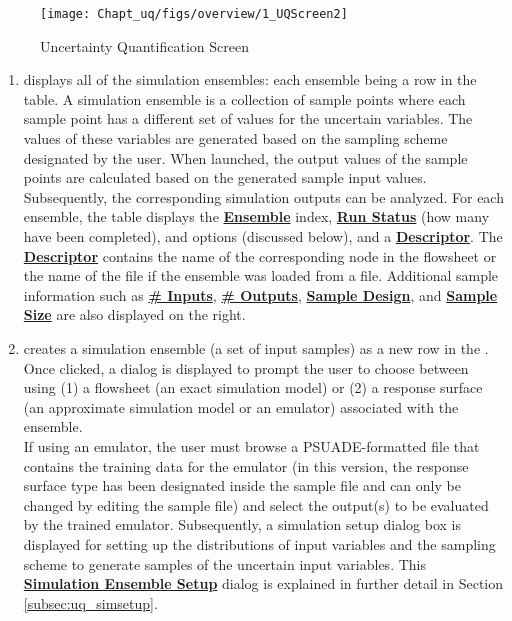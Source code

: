 \begin{figure}[H]
\centering \texttt{[image: Chapt\_uq/figs/overview/1\_UQScreen2]}
\caption{Uncertainty Quantification Screen}
\label{fig:uq_screen}
\end{figure}
\begin{enumerate}
\item
	 displays all of the simulation ensembles:
	each ensemble being a row in the table. A simulation ensemble is a
	collection of sample points where each sample point has a different set
	of values for the uncertain variables. The values of these variables are
	generated based on the sampling scheme designated by the user. When
	launched, the output values of the sample points are calculated based on
	the generated sample input values. Subsequently, the corresponding
	simulation outputs can be analyzed. For each ensemble, the table
	displays the \textbf{\underline{Ensemble}} index, \textbf{\underline{Run Status}} (how many have been
	completed),  and  options (discussed below), and a
	\textbf{\underline{Descriptor}}. The \textbf{\underline{Descriptor}} contains the name of the corresponding node
	in the flowsheet or the name of the file if the ensemble was loaded from
	a file. Additional sample information such as \textbf{\underline{\# Inputs}}, \textbf{\underline{\# Outputs}}, \textbf{\underline{Sample Design}}, and \textbf{\underline{Sample Size}} are also displayed on
	the right.
\item 
	 creates a simulation ensemble (a set of input samples)
	as a new row in the . Once clicked, a
	dialog is displayed to prompt the user to choose between using (1) a
	flowsheet (an exact simulation model) or (2) a response surface (an
	approximate simulation model or an emulator) associated with the
	ensemble. \\
	If using an emulator, the user must browse a PSUADE-formatted file that
	contains the training data for the emulator (in this version, the
	response surface type has been designated inside the sample file and can
	only be changed by editing the sample file) and select the output(s) to
	be evaluated by the trained emulator. Subsequently, a simulation setup
	dialog box is displayed for setting up the distributions of input
	variables and the sampling scheme to generate samples of the uncertain
	input variables. This \textbf{\underline{Simulation Ensemble Setup}} dialog is explained in further detail in Section \ref{subsec:uq_simsetup}.

\end{enumerate}
